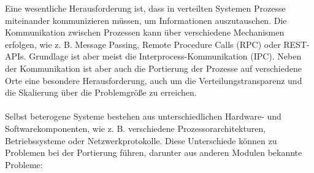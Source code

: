 \documentclass[../vs-script-first-v01.tex]{subfiles}
\begin{document}
Eine wesentliche Herausforderung ist, dass in verteilten Systemen Prozesse miteinander kommunizieren müssen, um Informationen auszutauschen. Die Kommunikation zwischen Prozessen kann über verschiedene Mechanismen erfolgen, wie z. B. Message Passing, Remote Procedure Calls (RPC) oder REST-APIs. Grundlage ist aber meist die Interprocess-Kommunikation (IPC).
Neben der Kommunikation ist aber auch die Portierung der Prozesse auf verschiedene Orte eine besondere Herausforderung, auch um die Verteilungstransparenz und die Skalierung über die Problemgröße zu erreichen. \\\\
Selbst beterogene Systeme bestehen aus unterschiedlichen Hardware- und Softwarekomponenten, wie z. B. verschiedene Prozessorarchitekturen, Betriebssysteme oder Netzwerkprotokolle. Diese Unterschiede können zu Problemen bei der Portierung führen, darunter aus anderen Modulen bekannte Probleme:
\end{document}
